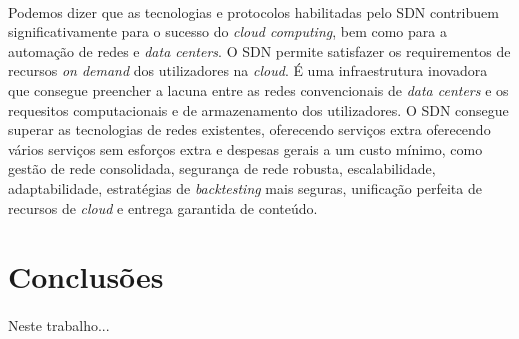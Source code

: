 \documentclass{llncs}
\begin{document}
\paragraph{}
Podemos dizer que as tecnologias e protocolos habilitadas pelo SDN contribuem significativamente para o sucesso do \textit {cloud computing}, bem como para a automação de redes e \textit {data centers}. O SDN permite satisfazer os requirementos de recursos \textit{on demand} dos utilizadores na \textit{cloud}. 
É uma infraestrutura inovadora que consegue preencher a lacuna entre as redes convencionais de \textit{data centers} e os requesitos computacionais e de armazenamento dos utilizadores.
O SDN consegue superar as tecnologias de redes existentes, oferecendo serviços extra oferecendo vários serviços sem esforços extra e despesas gerais a um custo mínimo, como gestão de rede consolidada, segurança de rede robusta, escalabilidade, adaptabilidade, estratégias de \textit {backtesting} mais seguras, unificação perfeita de recursos de \textit{cloud} e entrega garantida de conteúdo.

\section{Conclusões}
\paragraph{}
Neste trabalho...

\printbibliography
\end{document}
